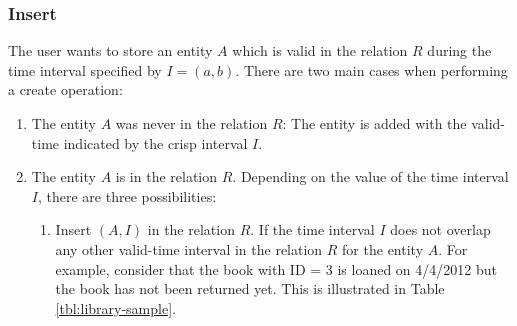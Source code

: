 \subsubsection{\label{subsubsec:insert}Insert}
The user wants to store an entity $A$ which is valid in the relation $R$ during the time interval specified by $I = \left(a, b \right)$.
%
%
There are two main cases when performing a create operation:
\begin{enumerate}
\item The entity $A$ was never in the relation $R$: The entity is added with the valid-time indicated by the crisp interval $I$. 


\item The entity $A$ is in the relation $R$. Depending on the value of the time interval $I$, there are three possibilities:
	\begin{enumerate}
	\item Insert $\left(A, I\right)$ in the relation $R$. If the time interval $I$ does not overlap any other valid-time interval in the relation $R$ for the entity $A$. For example, consider that the book with ID = 3 is loaned on 4/4/2012 but the book has not been returned yet. This is illustrated in Table \ref{tbl:library-sample}.



\end{enumerate}
\end{enumerate}
